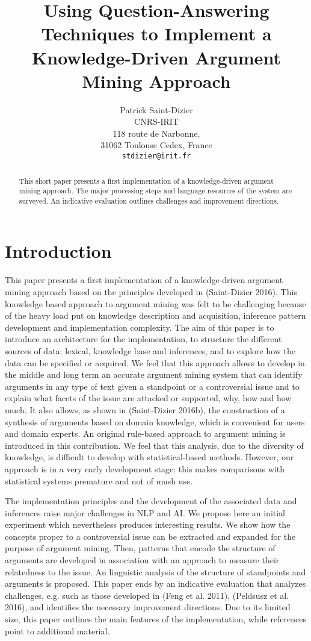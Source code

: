 \documentclass[11pt,letterpaper]{article}
\title{Using Question-Answering Techniques to Implement a Knowledge-Driven Argument Mining Approach}
\author{Patrick Saint-Dizier \\
CNRS-IRIT\\ 118 route de Narbonne, \\ 31062 Toulouse Cedex,  France\\
  {\tt stdizier@irit.fr}}
\date{}
\begin{document}
\maketitle

\begin{abstract}
 This short paper presents a first implementation of a knowledge-driven argument mining approach. The major processing steps and language resources of the system are surveyed. An indicative evaluation outlines challenges and improvement directions.
\end{abstract}


\section{Introduction}
 This  paper presents a first implementation of a knowledge-driven argument mining approach based on the principles developed in (Saint-Dizier 2016). 
This knowledge based approach to argument mining was felt to be challenging because of the heavy load put on knowledge description and acquisition, inference pattern development and implementation complexity. 
The aim of this paper is to introduce an architecture for the implementation, to structure the different sources of data: lexical, knowledge base and inferences, and to explore how the data
can be specified or acquired. We feel that this approach allows to develop in the middle and long term an accurate argument mining system that can identify arguments in any type of text given a standpoint or a controversial issue and to explain what facets of the issue are attacked or supported, why, how and how much. 
It also allows, as shown in (Saint-Dizier 2016b),  the construction of a synthesis of arguments based on domain knowledge, which is convenient for users and domain experts. 
An original rule-based approach to argument mining is introduced in this contribution.
We feel that this analysis, due to the diversity of knowledge, is difficult to develop with statistical-based methods. However, our approach is in a very early development stage: this makes  comparisons with statistical systems premature and not  of mush use.

 The implementation principles and the development of the  associated data and inferences raise major challenges in NLP and AI. We propose here an initial experiment which nevertheless produces interesting results.  We show how the concepts proper to a controversial issue can be extracted and expanded for the purpose of argument mining. Then, patterns that encode the structure of arguments are developed in association with an approach to measure their relatedness to the issue. 
An linguistic analysis of the structure of standpoints and arguments is proposed.
 This paper ends by an indicative evaluation
that analyzes challenges, e.g. such as those developed in  (Feng et al. 2011), (Peldsusz et al. 2016), and identifies the necessary improvement directions. Due to its limited size, this paper outlines the main features of the implementation, while references point to additional material. %
\end{document}
